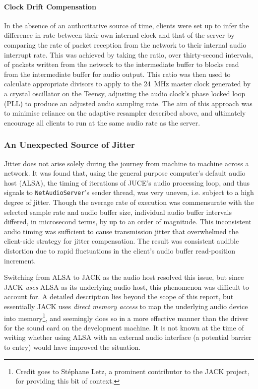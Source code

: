 \paragraph{Clock Drift Compensation}
In the absence of an authoritative source of time, clients were set up to infer
the difference in rate between their own internal clock and that of the server
by comparing the rate of packet reception from the network to their internal
audio interrupt rate.
This was achieved by taking the ratio, over thirty-second intervals, of
packets written from the network to the intermediate buffer to blocks read
from the intermediate buffer for audio output.
This ratio was then used to calculate appropriate divisors to apply to the
\qty{24}{\MHz} master clock generated by a crystal oscillator on the Teensy,
adjusting the audio clock's phase locked loop (PLL) to produce an adjusted audio
sampling rate.
The aim of this approach was to minimise reliance on the adaptive resampler
described above, and ultimately encourage all clients to run at the same audio
rate as the server.

\subsubsection{An Unexpected Source of Jitter}

Jitter does not arise solely during the journey from machine to machine across
a network.
It was found that, using the general purpose computer's default audio host
(ALSA), the timing of iterations of JUCE's audio processing loop, and thus
signals to \texttt{NetAudioServer}'s sender thread, was very uneven, i.e.
subject to a high degree of jitter.
Though the average rate of execution was commensurate with the selected sample
rate and audio buffer size, individual audio buffer intervals differed, in
microsecond terms, by up to an order of magnitude. This inconsistent audio
timing was sufficient to cause transmission jitter that overwhelmed
the client-side strategy for jitter compensation.
The result was consistent audible distortion due to rapid fluctuations in the
client's audio buffer read-position increment.

Switching from ALSA to JACK as the audio host resolved this issue, but since
JACK \textit{uses} ALSA as its underlying audio host, this phenomenon was
difficult to account for.
A detailed description lies beyond the scope of this report, but
essentially JACK uses \textit{direct memory access} to map the underlying audio
device into memory\footnote{
    Credit goes to Stéphane Letz, a prominent contributor to the JACK project,
    for providing this bit of context.
}, and seemingly does so in a more effective manner than the driver
for the sound card on the development machine.
It is not known at the time of writing whether using ALSA with an external audio
interface (a potential barrier to entry) would have improved the situation.

